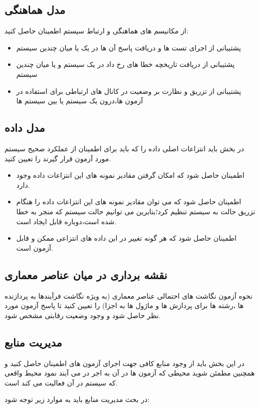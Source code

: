 \subsection{مدل هماهنگی}
از مکانیسم های هماهنگی و ارتباط سیستم اطمینان حاصل کنید:
\begin{itemize}
\item
پشتیبانی از اجرای تست ها و دریافت پاسخ آن ها در یک یا میان چندین سیستم
\item
پشتیبانی از دریافت تاریخچه خطا های رخ داد در یک سیستم و یا میان چندین سیستم
\item
پشتیبانی از تزریق و نظارت بر وضعیت در کانال های ارتباطی برای استفاده در آزمون ها،‌درون یک سیستم یا بین سیستم ها
\end{itemize}
\subsection{مدل داده}
در بخش باید انتزاعات اصلی داده را که باید برای اطمینان از عملکرد صحیح سیستم مورد آزمون قرار گیرند را تعیین کنید.
\begin{itemize}
\item
اطمینان حاصل شود که امکان گرفتن مقادیر نمونه های این انتزاعات داده وجود دارد.
\item
اطمینان حاصل شود که می توان مقادیر نمونه های این انتزاعات داده را هنگام تزریق حالت به سیستم تنظیم کرد؛‌بنابرین می توانیم حالت سیستم که منجر به خطا شده است،‌دوباره قابل ایجاد است.
\item
اطمینان حاصل شود که هر گونه تغییر در این داده های انتزاعی ممکن و قابل آزمون است.
\end{itemize}
\subsection{نقشه برداری در میان عناصر معماری}
نحوه آزمون نگاشت های احتمالی عناصر معماری (به ویژه نگاشت فرآیندها به پردازنده ها ،‌رشته ها برای پردازش ها و ماژول ها به اجزا) را تعیین کنید تا پاسخ آزمون مورد نظر حاصل شود و وجود وضعیت رقابتی مشخص شود.
\subsection{مدیریت منابع}
در این بخش باید از وجود منابع کافی جهت اجرای آزمون های اطمینان حاصل کنید و همچنین مطمئن شوید محیطی که آزمون ها در آن به اجر در می آیند نمود محیط واقعی که سیستم در آن فعالیت می کند است.

در بحث مدیریت منابع باید به موارد زیر توجه شود:

